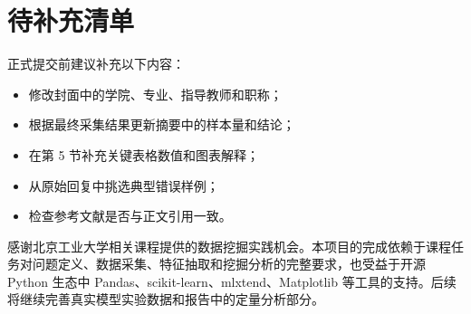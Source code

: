 \documentclass{BJUTReport}
\begin{document}
\section{待补充清单}

正式提交前建议补充以下内容：

\begin{itemize}
    \item 修改封面中的学院、专业、指导教师和职称；
    \item 根据最终采集结果更新摘要中的样本量和结论；
    \item 在第 5 节补充关键表格数值和图表解释；
    \item 从原始回复中挑选典型错误样例；
    \item 检查参考文献是否与正文引用一致。
\end{itemize}

\begin{acknowledgement}

感谢北京工业大学相关课程提供的数据挖掘实践机会。本项目的完成依赖于课程任务对问题定义、数据采集、特征抽取和挖掘分析的完整要求，也受益于开源 Python 生态中 Pandas、scikit-learn、mlxtend、Matplotlib 等工具的支持。后续将继续完善真实模型实验数据和报告中的定量分析部分。

\end{acknowledgement}
\end{document}

